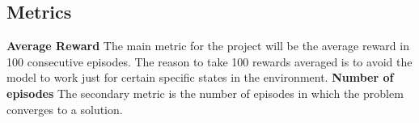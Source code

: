 \subsection{Metrics}
\label{sub:Metrics}

\textbf{Average Reward} The main metric for the project will be the average reward in 100 consecutive episodes. The reason to take 100 rewards averaged is to avoid the model to work just for certain specific states in the environment. 
\newline
\textbf{Number of episodes} The secondary metric is the number of episodes in which the problem converges to a solution.

